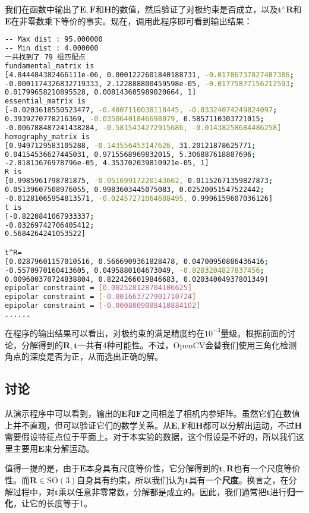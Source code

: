 我们在函数中输出了$\bm{E}, \bm{F}$和$\bm{H}$的数值，然后验证了对极约束是否成立，以及$\bm{t}^\wedge \bm{R}$和$\bm{E}$在非零数乘下等价的事实。现在，调用此程序即可看到输出结果：
\begin{lstlisting}[language=sh,caption=终端输入：]
% build/pose_estimation_2d2d 1.png 2.png
-- Max dist : 95.000000 
-- Min dist : 4.000000 
一共找到了 79 组匹配点
fundamental_matrix is 
[4.844484382466111e-06, 0.0001222601840188731, -0.01786737827487386;
-0.0001174326832719333, 2.122888800459598e-05, -0.01775877156212593;
0.01799658210895528, 0.008143605989020664, 1]
essential_matrix is 
[-0.0203618550523477, -0.4007110038118445, -0.03324074249824097;
0.3939270778216369, -0.03506401846698079, 0.5857110303721015;
-0.006788487241438284, -0.5815434272915686, -0.01438258684486258]
homography_matrix is 
[0.9497129583105288, -0.143556453147626, 31.20121878625771;
0.04154536627445031, 0.9715568969832015, 5.306887618807696;
-2.81813676978796e-05, 4.353702039810921e-05, 1]
R is 
[0.9985961798781875, -0.05169917220143662, 0.01152671359827873;
0.05139607508976055, 0.9983603445075083, 0.02520051547522442;
-0.01281065954813571, -0.02457271064688495, 0.9996159607036126]
t is 
[-0.8220841067933337;
-0.03269742706405412;
0.5684264241053522]

t^R=
[0.02879601157010516, 0.5666909361828478, 0.04700950886436416;
-0.5570970160413605, 0.0495880104673049, -0.8283204827837456;
0.009600370724838804, 0.8224266019846683, 0.02034004937801349]
epipolar constraint = [0.002528128704106625]
epipolar constraint = [-0.001663727901710724]
epipolar constraint = [-0.0008009088410884102]
......
\end{lstlisting}

在程序的输出结果可以看出，对极约束的满足精度约在$10 ^{-3}$量级。根据前面的讨论，分解得到的$\bm{R}, \bm{t}$一共有4种可能性。不过，OpenCV会替我们使用三角化检测角点的深度是否为正，从而选出正确的解。

\subsection*{讨论}
从演示程序中可以看到，输出的$\bm{E}$和$\bm{F}$之间相差了相机内参矩阵。虽然它们在数值上并不直观，但可以验证它们的数学关系。从$\bm{E}, \bm{F}$和$\bm{H}$都可以分解出运动，不过$\bm{H}$需要假设特征点位于平面上。对于本实验的数据，这个假设是不好的，所以我们这里主要用$\bm{E}$来分解运动。

值得一提的是，由于$\bm{E}$本身具有尺度等价性，它分解得到的$\bm{t}, \bm{R}$也有一个尺度等价性。而$\bm{R} \in \mathrm{SO}(3)$自身具有约束，所以我们认为$\bm{t}$具有一个\textbf{尺度}。换言之，在分解过程中，对$\bm{t}$乘以任意非零常数，分解都是成立的。因此，我们通常把$\bm{t}$进行\textbf{归一化}，让它的长度等于1。


